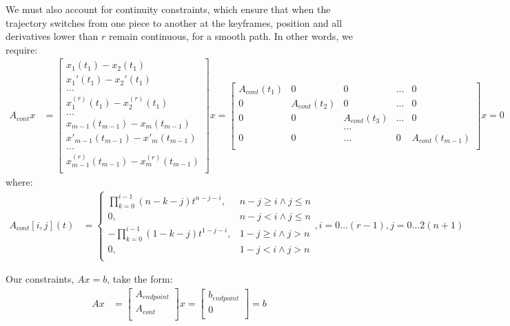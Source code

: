 \documentclass[11pt]{article}
\begin{document}
\mbox{} \newline
We must also account for continuity constraints, which ensure that when the trajectory switches from one piece to another at the keyframes, position and all derivatives lower than $r$ remain continuous, for a smooth path. In other words, we require:
\begin{align*}
A_{cont} x &= 
\begin{bmatrix}
  x_1 (t_1) - x_2(t_1) \\
  x_1' (t_1) - x_2'(t_1) \\
  ... \\
  x^{(r)}_1 (t_1) - x^{(r)}_2 (t_1) \\
    ... \\
  x_{m-1} (t_{m-1}) - x_{m} (t_{m-1}) \\
  x'_{m-1} (t_{m-1}) - x'_{m} (t_{m-1}) \\
  ... \\
  x^{(r)}_{m-1} (t_{m-1}) - x^{(r)}_m (t_{m-1}) \\
 \end{bmatrix} x = 
 \begin{bmatrix}
 A_{cont} (t_1) & 0 & 0 & ... & 0 \\
 0 & A_{cont} (t_2) & 0 & ... & 0 \\
 0 & 0 & A_{cont} (t_3) & ... & 0 \\
 & & ... & & \\
 0 & 0 & ... & 0 & A_{cont} (t_{m-1}) \\
  \end{bmatrix} x = 0
\end{align*} where:
\begin{align}
\label{eqn: Acont} A_{cont}[i, j] (t) &= 
\begin{cases}
    \prod_{k=0}^{i-1} {(n-k-j)} t^{n-j-i}, & n-j \ge i \land j \le n \\
    0, & n-j < i \land j \le n \\
     - \prod_{k=0}^{i-1} {(1-k-j)} t^{1-j-i}, & 1-j \ge i \land j > n \\   %
     0, & 1-j < i \land j > n \\       
\end{cases}, i = 0...(r-1), j = 0...2(n+1)
\end{align}

Our constraints, $Ax = b$, take the form:
\begin{align}
\label{eqn: Akeyframes} Ax &=
\begin{bmatrix}
A_{endpoint} \\
A_{cont} \\
 \end{bmatrix}
 x 
 = 
 \begin{bmatrix}
b_{endpoint} \\
0 \\
 \end{bmatrix} = b
\end{align}
\end{document}
